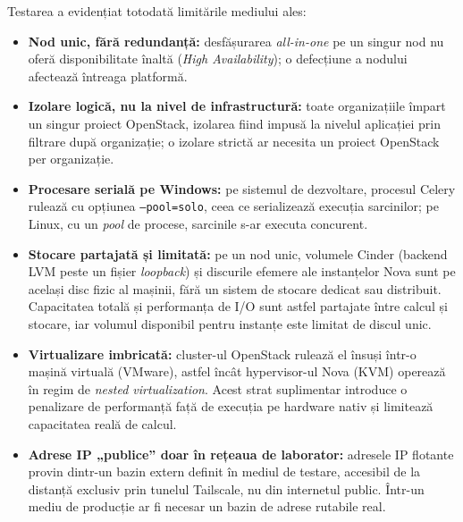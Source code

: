 Testarea a evidențiat totodată limitările mediului ales: 

\begin{itemize}
    \item \textbf{Nod unic, fără redundanță:} desfășurarea \textit{all-in-one} pe un singur nod nu oferă disponibilitate înaltă (\textit{High Availability}); o defecțiune a nodului afectează întreaga platformă.
    \item \textbf{Izolare logică, nu la nivel de infrastructură:} toate organizațiile împart un singur proiect OpenStack, izolarea fiind impusă la nivelul aplicației prin filtrare după organizație; o izolare strictă ar necesita un proiect OpenStack per organizație.
    \item \textbf{Procesare serială pe Windows:} pe sistemul de dezvoltare, procesul Celery rulează cu opțiunea \texttt{--pool=solo}, ceea ce serializează execuția sarcinilor; pe Linux, cu un \textit{pool} de procese, sarcinile s-ar executa concurent.
    \item \textbf{Stocare partajată și limitată:} pe un nod unic, volumele Cinder (backend LVM peste un fișier \textit{loopback}) și discurile efemere ale instanțelor Nova sunt pe același disc fizic al mașinii, fără un sistem de stocare dedicat sau distribuit. Capacitatea totală și performanța de I/O sunt astfel partajate între calcul și stocare, iar volumul disponibil pentru instanțe este limitat de discul unic.
    \item \textbf{Virtualizare imbricată:} cluster-ul OpenStack rulează el însuși într-o mașină virtuală (VMware), astfel încât hypervisor-ul Nova (KVM) operează în regim de \textit{nested virtualization}. Acest strat suplimentar introduce o penalizare de performanță față de execuția pe hardware nativ și limitează capacitatea reală de calcul.
    \item \textbf{Adrese IP „publice” doar în rețeaua de laborator:} adresele IP flotante provin dintr-un bazin extern definit în mediul de testare, accesibil de la distanță exclusiv prin tunelul Tailscale, nu din internetul public. Într-un mediu de producție ar fi necesar un bazin de adrese rutabile real.
\end{itemize}

